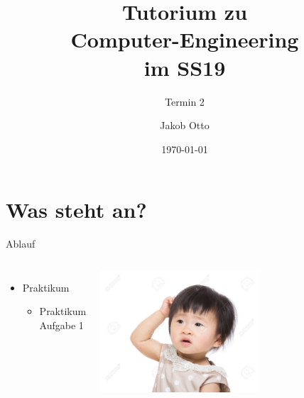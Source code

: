 \documentclass[aspectratio=169,presentation]{beamer}
\date{\today}
\newcommand{\terminNummer}{2}
\begin{document}
	\title[DT Tutorium]{Tutorium zu\\Computer-Engineering\\im SS19}
	\subtitle{Termin \terminNummer}
	\author[Otto]{Jakob Otto}
	\subject{CE Tutorium}
	
	\begin{frame}
		\titlepage
	\end{frame}

\section{Was steht an?}
\begin{frame}{Ablauf}
	\begin{columns}
		\column{0.6\textwidth}
		\begin{itemize}
			\item Praktikum
			\begin{itemize}
				\item Praktikum Aufgabe 1
			\end{itemize}
		\end{itemize}
		\column{0.4\textwidth}
		\includegraphics[width=0.6\textwidth]{kratzen}
	\end{columns}
\end{frame}

%
%
%
\end{document}
